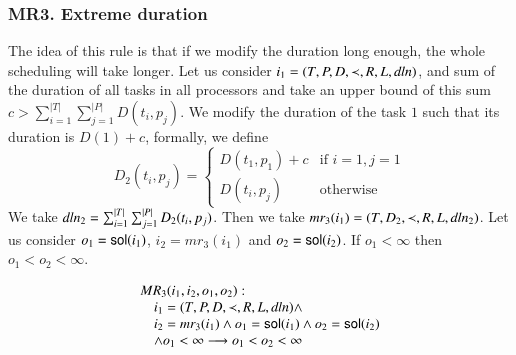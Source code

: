 



\subsubsection{MR3. Extreme duration}
The idea of this rule is that if we modify the duration long enough,
the whole scheduling will take longer. Let us consider
$i_{1}=(T, P, D, \prec, R, L, \mathit{dln})$, and sum of the duration
of all tasks in all processors and take an upper bound of this sum
$c>\sum_{i=1}^{|T|}\sum_{j=1}^{|P|}D(t_{i},p_{j})$. We modify the
duration of the task $1$ such that its duration is $D(1)+c$, formally, we
define
\begin{displaymath}
  D_{2}(t_{i}, p_{j})=
  \begin{cases}
    D(t_{1}, p_{1}) + c & \text{if } i=1, j=1\\
    D(t_{i}, p_{j}) & \text{otherwise}
  \end{cases}
\end{displaymath}
We take $\mathit{dln}_{2}=\sum_{i=1}^{|T|}\sum_{j=1}^{|P|}D_{2}(t_{i},p_{j})$.
Then we take $mr_{3}(i_{1})=(T, D_{2}, \prec, R, L, \mathit{dln}_{2})$. Let us
consider $o_{1}=\mathsf{sol}(i_{1})$, $i_{2}=mr_{3}(i_{1})$ and
$o_{2}=\mathsf{sol}(i_{2})$.
If $o_{1}<\infty$ then $o_{1}<o_{2}<\infty$.

\begin{framed}
  \begin{displaymath}
      \begin{array}{l}
    MR_{3}(i_1,i_2,o_{1},o_{2}):\\
      \hskip 1em i_1=(T,P,D,\prec,R,L,\mathit{dln}) \wedge  \\
      \hskip 1em  i_2=mr_3(i_1)\wedge o_{1}=\mathsf{sol}(i_{1})\wedge o_{2}=\mathsf{sol}(i_2)\\
      \hskip 1em \wedge o_{1}<\infty
      \longrightarrow o_{1}<o_2<\infty
    \end{array}
  \end{displaymath}
\end{framed}











